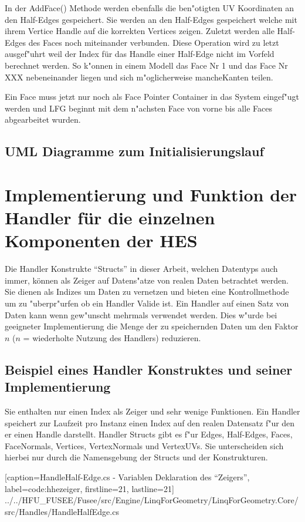 \documentclass[pagesize, paper=a4, fontsize=12pt,titlepage=true, headings=small, headnosepline, abstractoff, liststotoc, nochapterprefix, plainheadsepline]{scrreprt}
\begin{document}
In der AddFace() Methode werden ebenfalls die ben"otigten UV Koordinaten an den Half-Edges gespeichert. Sie werden an den Half-Edges gespeichert welche mit ihrem Vertice Handle auf die korrekten Vertices zeigen. Zuletzt werden alle Half-Edges des Faces noch miteinander verbunden. Diese Operation wird zu letzt ausgef"uhrt weil der Index für das Handle einer Half-Edge nicht im Vorfeld berechnet werden. So k"onnen in einem Modell das Face Nr 1 und das Face Nr XXX nebeneinander liegen und sich m"oglicherweise mancheKanten teilen.

Ein Face muss jetzt nur noch als Face Pointer Container in das System eingef"ugt werden und LFG beginnt mit dem n"achsten Face von vorne bis alle Faces abgearbeitet wurden.

		\subsection {UML Diagramme zum Initialisierungslauf}
	\section {Implementierung und Funktion der Handler für die einzelnen Komponenten der HES}
Die Handler Konstrukte "`Structs"' in dieser Arbeit, welchen Datentyps auch immer, können als Zeiger auf Datens"atze von realen Daten betrachtet werden. Sie dienen als Indizes um Daten zu vernetzen und bieten eine Kontrollmethode um zu "uberpr"urfen ob ein Handler Valide ist. Ein Handler auf einen Satz von Daten kann wenn gew"unscht mehrmals verwendet werden. Dies w"urde bei geeigneter Implementierung die Menge der zu speichernden Daten um den Faktor \(n\) (\(n\) = wiederholte Nutzung des Handlers) reduzieren.
		\subsection {Beispiel eines Handler Konstruktes und seiner Implementierung}
Sie enthalten nur einen Index als Zeiger und sehr wenige Funktionen. Ein Handler speichert zur Laufzeit pro Instanz einen Index auf den realen Datensatz f"ur den er einen Handle darstellt. Handler Structs gibt es f"ur Edges, Half-Edges, Faces, FaceNormals, Vertices, VertexNormals und VertexUVs. Sie unterscheiden sich hierbei nur durch die Namensgebung der Structs und der Konstrukturen.

			[caption={HandleHalf-Edge.cs - Variablen Deklaration des "`Zeigers"'}, label=code:hhezeiger, firstline=21, lastline=21]
			{../../HFU_FUSEE/Fusee/src/Engine/LinqForGeometry/LinqForGeometry.Core/src/Handles/HandleHalfEdge.cs}
\end{document}
